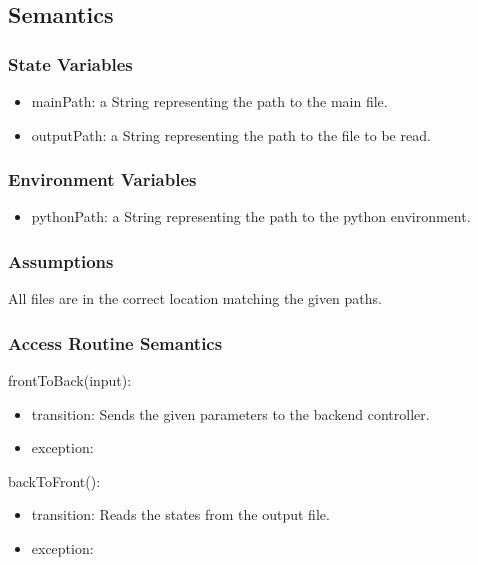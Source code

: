 \documentclass[12pt, titlepage]{article}
\begin{document}
\subsection{Semantics}

\subsubsection{State Variables}

\begin{itemize}
  \item mainPath: a String representing the path to the main file.
  \item outputPath: a String representing the path to the file to be read.
\end{itemize}

\subsubsection{Environment Variables}

\begin{itemize}
  \item pythonPath: a String representing the path to the python environment.
\end{itemize}

\subsubsection{Assumptions}

All files are in the correct location matching the given paths.

\subsubsection{Access Routine Semantics}

\noindent frontToBack(input):
\begin{itemize}
\item transition: Sends the given parameters to the backend controller.
\item exception:  
\end{itemize}

\noindent backToFront():
\begin{itemize}
  \item transition: Reads the states from the output file.
  \item exception: 
\end{itemize}
\end{document}
